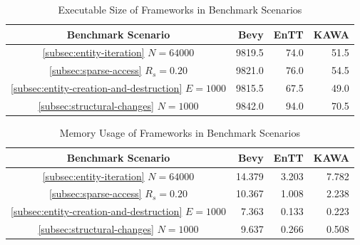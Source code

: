 \documentclass[conference]{IEEEtran}
\begin{document}
    \begin{table}
        \caption{Executable Size of Frameworks in Benchmark Scenarios}
        \begin{center}
            \begin{tabular}{|c|r|r|r|}
                \hline
                \textbf{Benchmark Scenario} & \textbf{Bevy} & \textbf{EnTT} & \textbf{KAWA} \\
                \hline
                \ref{subsec:entity-iteration} $N = 64000$ & 9819.5 & 74.0  & 51.5 \\
                \hline
                \ref{subsec:sparse-access} $R_s = 0.20$ & 9821.0 & 76.0  & 54.5 \\
                \hline
                \ref{subsec:entity-creation-and-destruction} $E = 1000$ & 9815.5 & 67.5  & 49.0 \\
                \hline
                \ref{subsec:structural-changes} $N = 1000$ & 9842.0 & 94.0  & 70.5 \\
                \hline
            \end{tabular}
        \end{center}
        \label{tab:results-executable-size}
    \end{table}

    \begin{table}
        \caption{Memory Usage of Frameworks in Benchmark Scenarios}
        \begin{center}
            \begin{tabular}{|c|r|r|r|}
                \hline
                \textbf{Benchmark Scenario} & \textbf{Bevy} & \textbf{EnTT} & \textbf{KAWA} \\
                \hline
                \ref{subsec:entity-iteration} $N = 64000$ & 14.379 & 3.203 & 7.782 \\
                \hline
                \ref{subsec:sparse-access} $R_s = 0.20$ & 10.367 & 1.008 & 2.238 \\
                \hline
                \ref{subsec:entity-creation-and-destruction} $E = 1000$ & 7.363 & 0.133 & 0.223 \\
                \hline
                \ref{subsec:structural-changes} $N = 1000$ & 9.637 & 0.266 & 0.508 \\
                \hline
            \end{tabular}
        \end{center}
        \label{tab:results-memory-usage}
    \end{table}
\end{document}
